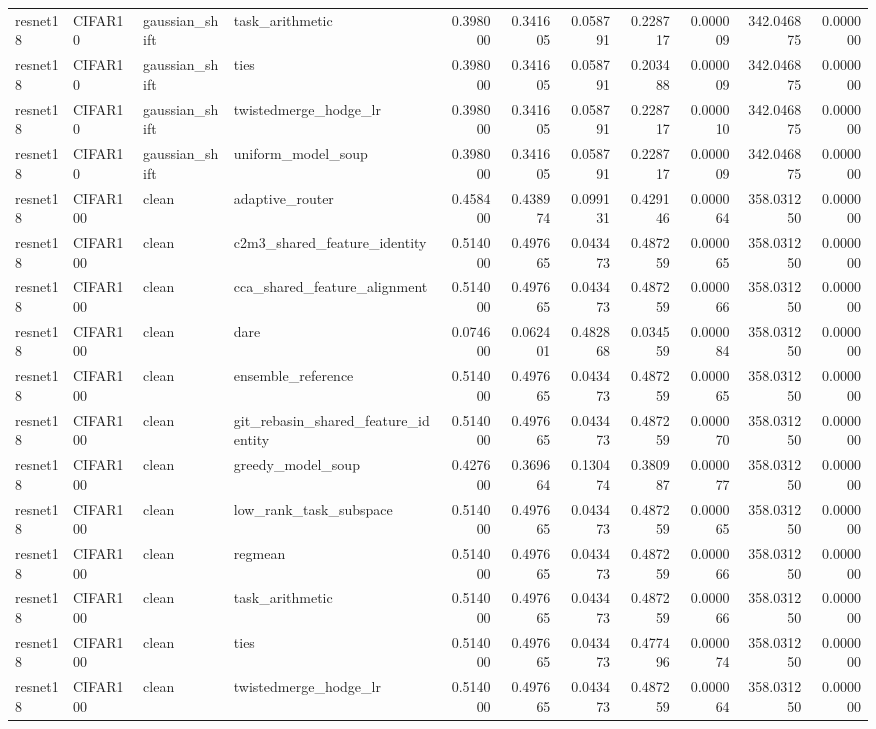 \begin{tabular}{llllrrrrrrr}
resnet18 & CIFAR10 & gaussian_shift & task_arithmetic & 0.398000 & 0.341605 & 0.058791 & 0.228717 & 0.000009 & 342.046875 & 0.000000 \\
resnet18 & CIFAR10 & gaussian_shift & ties & 0.398000 & 0.341605 & 0.058791 & 0.203488 & 0.000009 & 342.046875 & 0.000000 \\
resnet18 & CIFAR10 & gaussian_shift & twistedmerge_hodge_lr & 0.398000 & 0.341605 & 0.058791 & 0.228717 & 0.000010 & 342.046875 & 0.000000 \\
resnet18 & CIFAR10 & gaussian_shift & uniform_model_soup & 0.398000 & 0.341605 & 0.058791 & 0.228717 & 0.000009 & 342.046875 & 0.000000 \\
resnet18 & CIFAR100 & clean & adaptive_router & 0.458400 & 0.438974 & 0.099131 & 0.429146 & 0.000064 & 358.031250 & 0.000000 \\
resnet18 & CIFAR100 & clean & c2m3_shared_feature_identity & 0.514000 & 0.497665 & 0.043473 & 0.487259 & 0.000065 & 358.031250 & 0.000000 \\
resnet18 & CIFAR100 & clean & cca_shared_feature_alignment & 0.514000 & 0.497665 & 0.043473 & 0.487259 & 0.000066 & 358.031250 & 0.000000 \\
resnet18 & CIFAR100 & clean & dare & 0.074600 & 0.062401 & 0.482868 & 0.034559 & 0.000084 & 358.031250 & 0.000000 \\
resnet18 & CIFAR100 & clean & ensemble_reference & 0.514000 & 0.497665 & 0.043473 & 0.487259 & 0.000065 & 358.031250 & 0.000000 \\
resnet18 & CIFAR100 & clean & git_rebasin_shared_feature_identity & 0.514000 & 0.497665 & 0.043473 & 0.487259 & 0.000070 & 358.031250 & 0.000000 \\
resnet18 & CIFAR100 & clean & greedy_model_soup & 0.427600 & 0.369664 & 0.130474 & 0.380987 & 0.000077 & 358.031250 & 0.000000 \\
resnet18 & CIFAR100 & clean & low_rank_task_subspace & 0.514000 & 0.497665 & 0.043473 & 0.487259 & 0.000065 & 358.031250 & 0.000000 \\
resnet18 & CIFAR100 & clean & regmean & 0.514000 & 0.497665 & 0.043473 & 0.487259 & 0.000066 & 358.031250 & 0.000000 \\
resnet18 & CIFAR100 & clean & task_arithmetic & 0.514000 & 0.497665 & 0.043473 & 0.487259 & 0.000066 & 358.031250 & 0.000000 \\
resnet18 & CIFAR100 & clean & ties & 0.514000 & 0.497665 & 0.043473 & 0.477496 & 0.000074 & 358.031250 & 0.000000 \\
resnet18 & CIFAR100 & clean & twistedmerge_hodge_lr & 0.514000 & 0.497665 & 0.043473 & 0.487259 & 0.000064 & 358.031250 & 0.000000 \\

\end{tabular}
